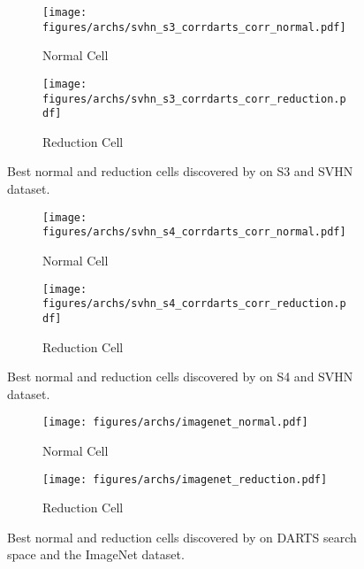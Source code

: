 \documentclass{article} \usepackage{fancyhdr, iclr2023_conference, times}
\begin{document}
\begin{figure}[h]
    \centering
    \begin{subfigure}[h]{0.5\textwidth}
        \centering
        \texttt{[image: figures/archs/svhn\_s3\_corrdarts\_corr\_normal.pdf]}
        \caption{Normal Cell}
    \end{subfigure}\begin{subfigure}[h]{0.5\textwidth}
        \centering
        \texttt{[image: figures/archs/svhn\_s3\_corrdarts\_corr\_reduction.pdf]}
        \caption{Reduction Cell}
    \end{subfigure}
    \caption{Best normal and reduction cells discovered by  on S3 and SVHN dataset.}
\end{figure}
\begin{figure}[h]
    \centering
    \begin{subfigure}[h]{0.5\textwidth}
        \centering
        \texttt{[image: figures/archs/svhn\_s4\_corrdarts\_corr\_normal.pdf]}
        \caption{Normal Cell}
    \end{subfigure}\begin{subfigure}[h]{0.5\textwidth}
        \centering
        \texttt{[image: figures/archs/svhn\_s4\_corrdarts\_corr\_reduction.pdf]}
        \caption{Reduction Cell}
    \end{subfigure}
    \caption{Best normal and reduction cells discovered by  on S4 and SVHN dataset.}
\end{figure}
\begin{figure}[h]
    \centering
    \begin{subfigure}[h]{0.5\textwidth}
        \centering
        \texttt{[image: figures/archs/imagenet\_normal.pdf]}
        \caption{Normal Cell}
    \end{subfigure}\begin{subfigure}[h]{0.5\textwidth}
        \centering
        \texttt{[image: figures/archs/imagenet\_reduction.pdf]}
        \caption{Reduction Cell}
    \end{subfigure}
    \caption{Best normal and reduction cells discovered by  on DARTS search space and the ImageNet dataset.}
    \label{fig:imagenet-cells}
\end{figure}
\end{document}
